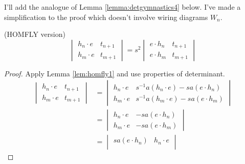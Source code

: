 I'll add the analogue of Lemma \ref{lemma:detgymnastics4} below. I've made a simplification to the proof which doesn't involve wiring diagrams $W_n$. 
\begin{lemma} \label{lem:homfly3} (HOMFLY version)
\[
\begin{vmatrix}
h_n \cdot e & t_{n+1} \\
h_m \cdot e & t_{m+1}
\end{vmatrix}
= s^2
\begin{vmatrix}
e \cdot h_n & t_{n+1} \\
e \cdot h_m & t_{m+1}
\end{vmatrix}
\]
\end{lemma}
\begin{proof}
Apply Lemma \ref{lem:homfly1} and use properties of determinant.
\begin{align*}
\begin{vmatrix}
h_n \cdot e & t_{n+1} \\
h_m \cdot e & t_{m+1}
\end{vmatrix}
& = 
\begin{vmatrix}
h_n \cdot e & s^{-1} a ( h_{n} \cdot e ) - s a ( e \cdot h_{n} ) \\
h_m \cdot e & s^{-1} a ( h_{m} \cdot e ) - s a ( e \cdot h_{m} )
\end{vmatrix} \\
& = 
\begin{vmatrix}
h_n \cdot e & - s a ( e \cdot h_{n} ) \\
h_m \cdot e & - s a ( e \cdot h_{m} )
\end{vmatrix} \\
& = 
\begin{vmatrix}
 s a ( e \cdot h_{n} ) & h_n \cdot e \\

\end{vmatrix}
\end{align*}
\end{proof}

